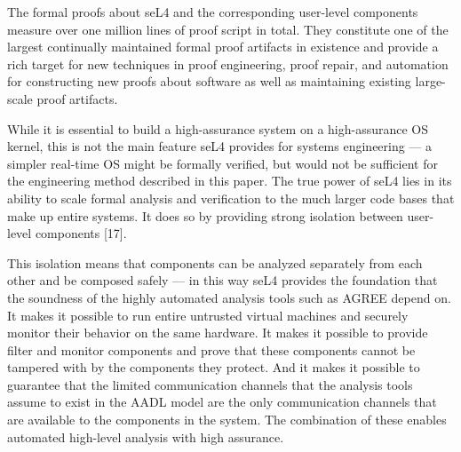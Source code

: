 The formal proofs about seL4 and the corresponding user-level components measure over one million lines of proof script in total. They constitute one of the largest continually maintained formal proof artifacts in existence and provide a rich target for new techniques in proof engineering, proof repair, and automation for constructing new proofs about software as well as maintaining existing large-scale proof artifacts. 

While it is essential to build a high-assurance system on a high-assurance OS kernel, this is not the main feature seL4 provides for systems engineering — a simpler real-time OS might be formally verified, but would not be sufficient for the engineering method described in this paper. The true power of seL4 lies in its ability to scale formal analysis and verification to the much larger code bases that make up entire systems. It does so by providing strong isolation between user-level components [17].

This isolation means that components can be analyzed separately from each other and be composed safely — in this way seL4 provides the foundation that the soundness of the highly automated analysis tools such as AGREE depend on. It makes it possible to run entire untrusted virtual machines and securely monitor their behavior on the same hardware. It makes it possible to provide filter and monitor components and prove that these components cannot be tampered with by the components they protect. And it makes it possible to guarantee that the limited communication channels that the analysis tools assume to exist in the AADL model are the only communication channels that are available to the components in the system. The combination of these enables automated high-level analysis with high assurance.







